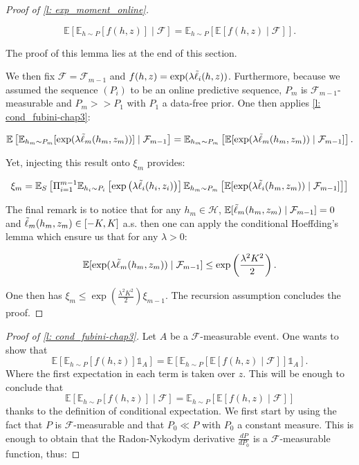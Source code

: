 \begin{noaddcontents}
\begin{proof}[Proof of \cref{l: exp_moment_online}]
\begin{lemma}
  \[ \mathbb{E}\left[\mathbb{E}_{h\sim P} [f(h,z)] \mid \mathcal{F} \right] =  \mathbb{E}_{h\sim P} \left[ \mathbb{E}[f(h,z)\mid \mathcal{F}] \right].    \]
\end{lemma}

\noindent The proof of this lemma lies at the end of this section.

\noindent We then fix $\mathcal{F}= \mathcal{F}_{m-1}$ and $f(h,z)= \exp(\lambda\Tilde{\ell}_i(h,z))$. Furthermore, because we assumed the sequence $(P_i)$ to be an online predictive sequence, $P_m$ is $\mathcal{F}_{m-1}$-measurable and $P_m>>P_1$ with $P_1$ a data-free prior. One then applies \cref{l: cond_fubini-chap3}:

\[ \mathbb{E}
\left[ \mathbb{E}_{h_m\sim P_m} [\exp(\lambda \Tilde{\ell}_m(h_m,z_m))] \mid \mathcal{F}_{m-1} \right] =  \mathbb{E}_{h_m\sim P_m} \left[ \mathbb{E}
[\exp(\lambda \Tilde{\ell}_m(h_m,z_m)) \mid \mathcal{F}_{m-1}] \right] . \]

\noindent Yet, injecting this result onto $\xi_m$ provides:

\begin{align*}
  \xi_m = \mathbb{E}_S\left[ \Pi_{i=1}^{m-1}\mathbb{E}_{h_i \sim P_i} \left[\exp\left(\lambda  \Tilde{\ell}_i(h_i,z_i)\right)\right] \mathbb{E}_{h_m\sim P_m} \left[ \mathbb{E}
  [\exp(\lambda \Tilde{\ell}_i(h_m,z_m)) \mid \mathcal{F}_{m-1}] \right] \right]
\end{align*}

The final remark is to notice that for any $h_m\in\mathcal{H}$, $\mathbb{E}[\Tilde{\ell}_m(h_m,z_m)\mid \mathcal{F}_{m-1}] = 0$ and $\Tilde{\ell}_m(h_m,z_m)\in [-K,K]$ a.s. then one can apply the conditional Hoeffding's lemma which ensure us that for any $\lambda>0$:

\[ \mathbb{E}
[\exp(\lambda \Tilde{\ell}_m(h_m,z_m)) \mid \mathcal{F}_{m-1}] \leq \exp\left( \frac{\lambda^2K^2}{2}   \right). \]

One then has $\xi_m \leq \exp\left( \frac{\lambda^2K^2}{2}   \right) \xi_{m-1}$. The recursion assumption concludes the proof.


\end{proof}



\begin{proof}[Proof of \cref{l: cond_fubini-chap3}]
 Let $A$ be a $\mathcal{F}$-measurable event. One wants to show that
  \[ \mathbb{E}\left[\mathbb{E}_{h\sim P} [f(h,z)]\mathds{1}_A \right] = \mathbb{E}\left[\mathbb{E}_{h\sim P} \left[ \mathbb{E}[f(h,z)\mid \mathcal{F}] \right] \mathds{1}_A \right]. \]
  \noindent Where the first expectation in each term is taken over $z$. This will be enough to conclude that
  \[ \mathbb{E}\left[\mathbb{E}_{h\sim P} [f(h,z)]\mid \mathcal{F} \right] = \mathbb{E}_{h\sim P} \left[ \mathbb{E}[f(h,z)\mid \mathcal{F}] \right]   \]
  \noindent thanks to the definition of conditional expectation. We first start by using the fact that $P$ is $\mathcal{F}$-measurable and that $P_0 \ll P$ with $P_0$ a constant measure. This is enough to obtain that the Radon-Nykodym derivative $\frac{dP}{dP_0}$ is a $\mathcal{F}$-measurable function, thus:


\end{proof}
\end{noaddcontents}
